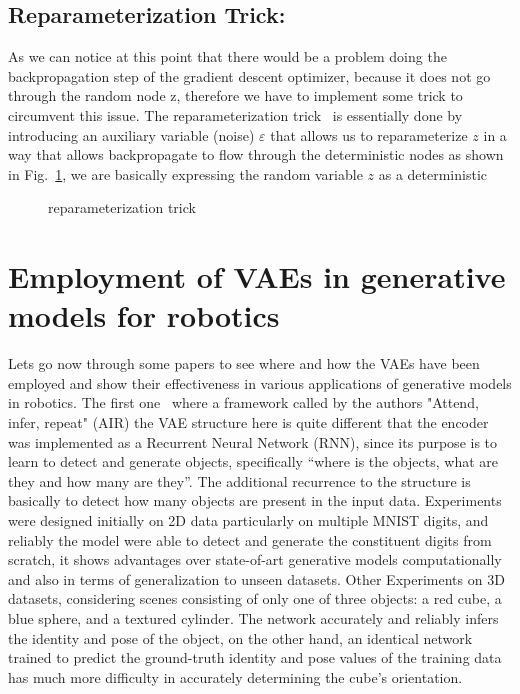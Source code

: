 \subsection{Reparameterization Trick:}
As we can notice at this point that there would be a problem doing the backpropagation step of the gradient descent optimizer, because it does not go through the random node z, therefore we have to implement some trick to circumvent this issue. The reparameterization trick~\cite{kingma2013auto} is essentially done by introducing an auxiliary variable (noise) $\varepsilon$ that allows us to reparameterize $z$ in a way that allows backpropagate to flow through the deterministic nodes as shown in Fig.~\ref{fig:paratrick}, we are basically expressing the random variable $z$ as a deterministic 

\begin{figure}
	\centerline
	\paratrick
	\caption{reparameterization trick}
	\label{fig:paratrick}
\end{figure} 


\section{Employment of VAEs in generative models for robotics}
Lets go now through some papers to see where and how the VAEs have been employed and show their effectiveness in various applications of generative models in robotics. The first one~\cite{eslami2016attend} where a framework called by the authors "Attend, infer, repeat" (AIR) the VAE structure here is quite different that the encoder was implemented as a Recurrent Neural Network (RNN), since its purpose is to learn to detect and generate objects, specifically “where is the objects, what are they and how many are they”. The additional recurrence to the structure is basically to detect how many objects are present in the input data. Experiments were designed initially on 2D data particularly on multiple MNIST digits, and reliably the model were able to detect and generate the constituent digits from scratch, it shows advantages over state-of-art generative models computationally and also in terms of generalization to unseen datasets. Other Experiments on 3D datasets, considering scenes consisting of only one of three objects: a red cube, a blue sphere, and a textured cylinder. The network accurately and reliably infers the identity and pose of the object, on the other hand, an identical network trained to predict the ground-truth identity and pose values of the training data has much more difficulty in accurately determining the cube’s orientation.\\


